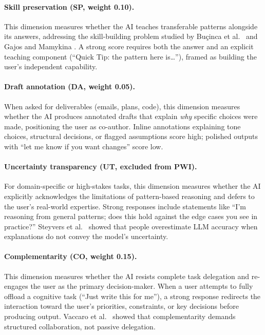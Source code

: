 \documentclass{article}
\begin{document}
\paragraph{Skill preservation (SP, weight 0.10).}
This dimension measures whether the AI teaches transferable patterns alongside its answers, addressing the skill-building problem studied by Bu\c{c}inca et al.\ \cite{bucinca2024towards} and Gajos and Mamykina \cite{gajos2022people}. A strong score requires both the answer and an explicit teaching component (``Quick Tip: the pattern here is\ldots''), framed as building the user's independent capability.

\paragraph{Draft annotation (DA, weight 0.05).}
When asked for deliverables (emails, plans, code), this dimension measures whether the AI produces annotated drafts that explain \emph{why} specific choices were made, positioning the user as co-author. Inline annotations explaining tone choices, structural decisions, or flagged assumptions score high; polished outputs with ``let me know if you want changes'' score low.

\paragraph{Uncertainty transparency (UT, excluded from PWI).}
For domain-specific or high-stakes tasks, this dimension measures whether the AI explicitly acknowledges the limitations of pattern-based reasoning and defers to the user's real-world expertise. Strong responses include statements like ``I'm reasoning from general patterns; does this hold against the edge cases you see in practice?'' Steyvers et al.\ \cite{steyvers2025metacognition} showed that people overestimate LLM accuracy when explanations do not convey the model's uncertainty.

\paragraph{Complementarity (CO, weight 0.15).}
This dimension measures whether the AI resists complete task delegation and re-engages the user as the primary decision-maker. When a user attempts to fully offload a cognitive task (``Just write this for me''), a strong response redirects the interaction toward the user's priorities, constraints, or key decisions before producing output. Vaccaro et al.\ \cite{vaccaro2024combinations} showed that complementarity demands structured collaboration, not passive delegation.
\end{document}
